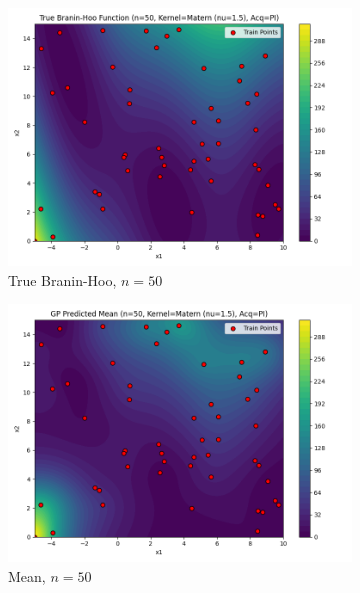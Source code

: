 \documentclass[a4paper,12pt]{article}
\begin{document}
\begin{figure}[H]
\begin{subfigure}{0.3\textwidth}
  \includegraphics[width=\linewidth]{Task-02/images/true_function_matern_n50_PI.png}
  \caption{True Branin-Hoo, $n=50$}
\end{subfigure}
\begin{subfigure}{0.3\textwidth}
    \includegraphics[width=\linewidth]{Task-02/images/gp_mean_matern_n50_PI.png}
    \caption{Mean, $n=50$}
\end{subfigure}
\begin{subfigure}{0.3\textwidth}

\end{subfigure}
\end{figure}
\end{document}
